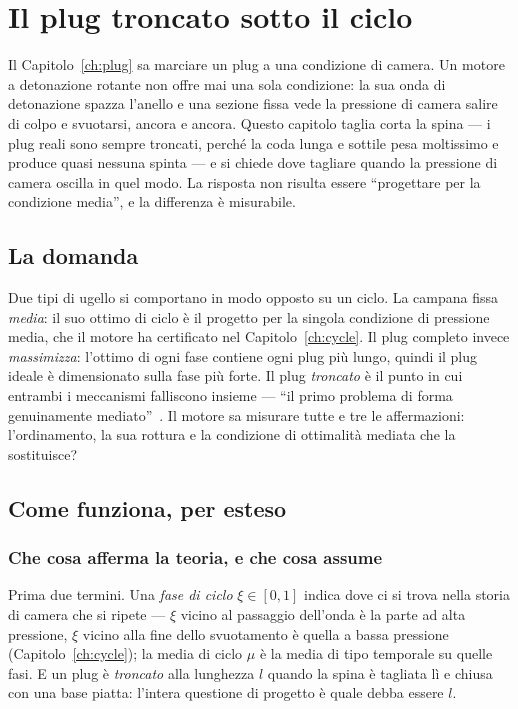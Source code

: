 \chapter{Il plug troncato sotto il ciclo}
\label{ch:plugcycle}

Il Capitolo~\ref{ch:plug} sa marciare un plug a una condizione di
camera. Un motore a detonazione rotante non offre mai una sola
condizione: la sua onda di detonazione spazza l'anello e una sezione
fissa vede la pressione di camera salire di colpo e svuotarsi,
ancora e ancora. Questo capitolo taglia corta la spina --- i plug
reali sono sempre troncati, perché la coda lunga e sottile pesa
moltissimo e produce quasi nessuna spinta --- e si chiede dove
tagliare quando la pressione di camera oscilla in quel modo. La
risposta non risulta essere ``progettare per la condizione media'', e
la differenza è misurabile.

\section{La domanda}

Due tipi di ugello si comportano in modo opposto su un ciclo. La
campana fissa \emph{media}: il suo ottimo di ciclo è il progetto per
la singola condizione di pressione media, che il motore ha
certificato nel Capitolo~\ref{ch:cycle}. Il plug completo invece
\emph{massimizza}: l'ottimo di ogni fase contiene ogni plug più
lungo, quindi il plug ideale è dimensionato sulla fase più forte. Il
plug \emph{troncato} è il punto in cui entrambi i meccanismi
falliscono insieme --- ``il primo problema di forma genuinamente
mediato''~\cite{theory}. Il motore sa misurare tutte e tre le
affermazioni: l'ordinamento, la sua rottura e la condizione di
ottimalità mediata che la sostituisce?

\section{Come funziona, per esteso}

\subsection{Che cosa afferma la teoria, e che cosa assume}

Prima due termini. Una \emph{fase di ciclo} $\xi \in [0,1]$ indica
dove ci si trova nella storia di camera che si ripete --- $\xi$
vicino al passaggio dell'onda è la parte ad alta pressione, $\xi$
vicino alla fine dello svuotamento è quella a bassa pressione
(Capitolo~\ref{ch:cycle}); la media di ciclo $\mu$ è la media di
tipo temporale su quelle fasi. E un plug è \emph{troncato} alla
lunghezza $l$ quando la spina è tagliata lì e chiusa con una base
piatta: l'intera questione di progetto è quale debba essere $l$.

